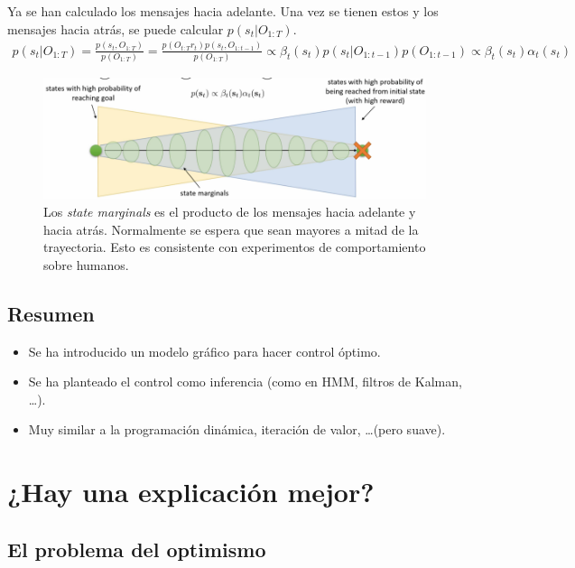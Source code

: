 Ya se han calculado los mensajes hacia adelante. Una vez se tienen estos y los mensajes hacia
atrás, se puede calcular  $p(s_t|O_{1:T})$.
\begin{align}
p ( s _ { t } | O _ { 1 : T } ) = \frac { p ( s _ { t } , O _ { 1 : T } ) } { p ( O _ { 1 : T } )
} = \frac { p ( O _ { t : T } r _ { t } ) p ( s _ { t } , O _ { 1 : t - 1 } ) } { p ( O _ { 1 : T
} ) } \propto \beta _ { t } ( s _ { t } ) p ( s _ { t } | O _ { 1 : t - 1 } ) p ( O _ { 1 : t - 1
} ) \propto \beta_t(s_t)\alpha_t(s_t)
\end{align}
\begin{figure}[H]
	\centering
	\includegraphics[width=0.8\linewidth]{figures/2020-07-04-202639_958x304_scrot.png}
    \caption{Los \textit{state marginals} es el producto de los mensajes hacia adelante y
    hacia atrás. Normalmente se espera que sean mayores a mitad de la trayectoria. Esto es
consistente con experimentos de comportamiento sobre humanos.}
\end{figure}

\subsection{Resumen}%
\label{sub:resumen}

\begin{itemize}
    \item Se ha introducido un modelo gráfico para hacer control óptimo.
    \item Se ha planteado el control como inferencia (como en HMM, filtros de Kalman, \ldots).
    \item Muy similar a la programación dinámica, iteración de valor, \ldots (pero suave).
\end{itemize}

 \section{¿Hay una explicación mejor?}%
 \label{sec:_hay_una_explicación_mejor_}

 \subsection{El problema del optimismo}%
 \label{sub:el_problema_del_optimismo}
 
